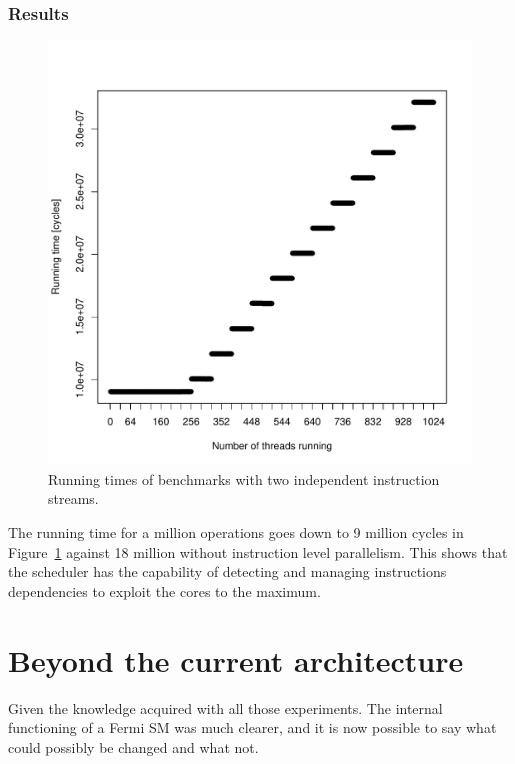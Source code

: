 \documentclass{report}
\def \scalingfactor{.8}
\begin{document}
    \subsection{Results}
    \begin{figure}[H]
		\centering
        \includegraphics[width=\scalingfactor\linewidth]{"graphics/ilp_graph"}
		\vspace{-15pt}
		\captionsetup{justification=centering}
        \caption{Running times of benchmarks with two independent instruction streams.}
        \label{fig:ilp_results}
    \end{figure}

    The running time for a million operations goes down to 9 million cycles in Figure~\ref{fig:ilp_results}
    against 18 million without instruction level parallelism. This shows that the scheduler has the
    capability of detecting and managing instructions dependencies to exploit the cores to the maximum.
    
\chapter{Beyond the current architecture}
    Given the knowledge acquired with all those experiments. The internal functioning of a Fermi SM was much clearer, and it is now possible to say what could possibly be changed and what not.
\end{document}
